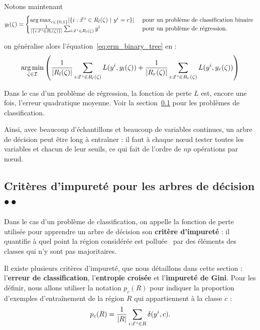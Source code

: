 Notons maintenant
\begin{equation*}
  y_l(\zeta) =
  \begin{cases}
    \argmax_{c \in \{0, 1\}} \abs{\{i:\xx^i \in R_l(\zeta) ~|~y^i=c\}} & \text{ pour un problème de classification binaire } \\
    \frac1{\abs{\{i:\xx^i \in R_l(\zeta)\}}} \sum_{i:\xx^i \in R_l(\zeta)} y^i & \text{ pour un problème de régression.}
  \end{cases}
\end{equation*}

on généralise alors l'équation~\eqref{eq:erm_binary_tree} en :
\begin{equation}
  \argmin_{\zeta \in \Ical} \left( 
    \frac1{\abs{R_l(\zeta)}} \sum_{i: \xx^i \in R_l(\zeta)} L(y^i, y_l(\zeta))  + 
     \frac1{\abs{R_r(\zeta)}} \sum_{i: \xx^i \in R_r(\zeta)} L(y^i, y_r(\zeta))
  \right)
\end{equation}

Dans le cas d'un problème de régression, la fonction de perte $L$ est, encore
une fois, l'erreur quadratique moyenne. Voir la section~\ref{sec:impurity} pour
les problèmes de classification.

Ainsi, avec beaucoup d'échantillons et beaucoup de variables continues, un
arbre de décision peut être long à entraîner : il faut à chaque n{\oe}ud tester
toutes les variables et chacun de leur seuils, ce qui fait de l'ordre de $np$
opérations par n{\oe}ud.

\subsection{Critères d'impureté pour les arbres de décision $\bullet \bullet$}
\label{sec:impurity}
Dans le cas d'un problème de classification, on appelle la fonction de perte
utilisée pour apprendre un arbre de décision son \textbf{critère d'impureté} :
il quantifie à quel point la région considérée est \og polluée \fg~par des
éléments des classes qui n'y sont pas
majoritaires.

Il existe plusieurs critères d'impureté, que nous détaillons dans cette section
: l'\textbf{erreur de classification}, l'\textbf{entropie croisée} et
l'\textbf{impureté de Gini}. Pour les définir, nous allons utiliser la notation
$p_c(R)$ pour indiquer la proportion d'exemples d'entraînement de la région $R$
qui appartiennent à la classe $c$ :
\begin{equation*}
  p_c(R) = \frac1{\lvert R \rvert} \sum_{i : \xx^i \in R} \delta(y^i, c).       
\end{equation*}

